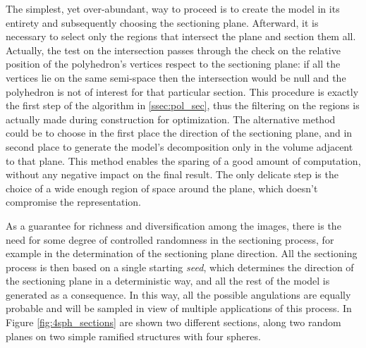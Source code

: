 \documentclass[12pt,a4paper]{report}
\begin{document}
\begin{figure}[ht]
            \label{fig:first_sect}
        \end{figure}

    The simplest, yet over-abundant, way to proceed is to create the model in its entirety and subsequently choosing the sectioning plane. Afterward, it is necessary to select only the regions that intersect the plane and section them all. Actually, the test on the intersection passes through the check on the relative position of the polyhedron's vertices respect to the sectioning plane: if all the vertices lie on the same semi-space then the intersection would be null and the polyhedron is not of interest for that particular section. This procedure is exactly the first step of the algorithm in \ref{ssec:pol_sec}, thus the filtering on the regions is actually made during construction for optimization. The alternative method could be to choose in the first place the direction of the sectioning plane, and in second place to generate the model's decomposition only in the volume adjacent to that plane. This method enables the sparing of a good amount of computation, without any negative impact on the final result. The only delicate step is the choice of a wide enough region of space around the plane, which doesn't compromise the representation.

    As a guarantee for richness and diversification among the images, there is the need for some degree of controlled randomness in the sectioning process, for example in the determination of the sectioning plane direction. All the sectioning process is then based on a single starting \textit{seed}, which determines the direction of the sectioning plane in a deterministic way, and all the rest of the model is generated as a consequence. In this way, all the possible angulations are equally probable and will be sampled in view of multiple applications of this process. In Figure \ref{fig:4sph_sections} are shown two different sections, along two random planes on two simple ramified structures with four spheres.
\end{document}
